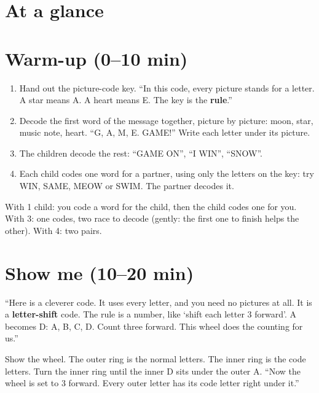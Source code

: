 \section{At a glance}
\begin{timeplan}
\end{timeplan}

\section{Warm-up (0--10 min)}
\begin{unplugged}
\begin{enumerate}[leftmargin=1.4em,itemsep=1pt]
  \item Hand out the picture-code key. \enquote{In this code, every picture stands for a letter. A star means A. A heart means E. The key is the \textbf{rule}.}
  \item Decode the first word of the message together, picture by picture: moon, star, music note, heart. \enquote{G, A, M, E. GAME!} Write each letter under its picture.
  \item The children decode the rest: \enquote{GAME ON}, \enquote{I WIN}, \enquote{SNOW}.
  \item Each child codes one word for a partner, using only the letters on the key: try WIN, SAME, MEOW or SWIM. The partner decodes it.
\end{enumerate}
With 1 child: you code a word for the child, then the child codes one for you. With 3: one codes, two race to decode (gently: the first one to finish helps the other). With 4: two pairs.
\end{unplugged}

\section{Show me (10--20 min)}
\begin{teacherscript}
\enquote{Here is a cleverer code. It uses every letter, and you need no pictures at all. It is a \textbf{letter-shift} code. The rule is a number, like \enquote{shift each letter 3 forward}. A becomes D: A, B, C, D. Count three forward. This wheel does the counting for us.}

Show the wheel. The outer ring is the normal letters. The inner ring is the code letters. Turn the inner ring until the inner D sits under the outer A. \enquote{Now the wheel is set to 3 forward. Every outer letter has its code letter right under it.}
\end{teacherscript}

